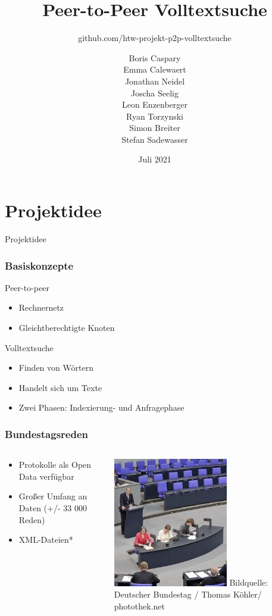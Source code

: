 \documentclass{beamer}
\title{Peer-to-Peer Volltextsuche}
\subtitle{github.com/htw-projekt-p2p-volltextsuche}
\author{
  Boris Caspary \\
  Emma Calewaert \\
  Jonathan Neidel \\
  Joscha Seelig \\
  Leon Enzenberger \\
  Ryan Torzynski \\
  Simon Breiter \\
  Stefan Sadewasser \\
}
\date{Juli 2021}
\institute{HTW Berlin, Angewandte Informatik, Projektstudium bei Herr Prof. Hoppe}
\begin{document}
\frame{\titlepage}

\section{Projektidee}
\begin{frame}
  \begin{center}
    {\Huge Projektidee}
  \end{center}
\end{frame}

\begin{frame}[allowframebreaks]
  \frametitle{Basiskonzepte}
  Peer-to-peer
  \begin{itemize}
    \item Rechnernetz
    \item Gleichtberechtigte Knoten
  \end{itemize}

  \break
  Volltextsuche
    \begin{itemize}
    \item Finden von Wörtern
    \item Handelt sich um Texte
    \item Zwei Phasen: Indexierung- und Anfragephase
  \end{itemize}
\end{frame}

\begin{frame}
  \frametitle{Bundestagsreden}
  \begin{columns}
    \begin{column}{0.5\textwidth}
      \begin{itemize}
        \item Protokolle als Open Data verfügbar
        \item Großer Umfang an Daten (+/- 33 000 Reden)
        \item XML-Dateien*
      \end{itemize}
    \end{column}
    \begin{column}{0.5\textwidth}
      \includegraphics[width=5cm]{BundestagProtokoll}
      {\tiny Bildquelle: Deutscher Bundestag / Thomas Köhler/ photothek.net}
    \end{column}
  \end{columns}
\end{frame}
\end{document}
